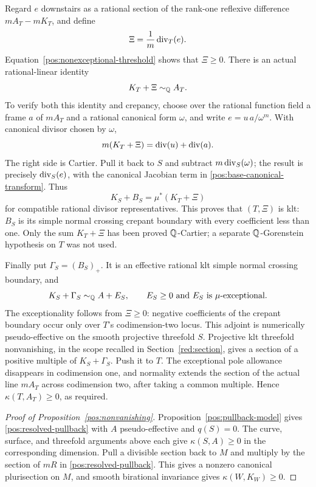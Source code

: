 Regard \(e\) downstairs as a rational section of the rank-one
reflexive difference \(mA_T-mK_T\), and define
\begin{equation}\label{pos:base-boundary}
 \Xi=\frac1m\operatorname{div}_T(e).
\end{equation}
Equation~\eqref{pos:nonexceptional-threshold} shows that
\(\Xi\geq0\). There is an actual rational-linear identity
\begin{equation}\label{pos:base-adjoint}
 K_T+\Xi\sim_{\mathbb{Q}}A_T.
\end{equation}
To verify both this identity and crepancy, choose over the rational
function field a frame \(a\) of \(mA_T\) and a rational canonical
form \(\omega\), and write \(e=u\,a/\omega^m\). With canonical
divisor chosen by \(\omega\),
\[
 m(K_T+\Xi)=\operatorname{div}(u)+\operatorname{div}(a).
\]
The right side is Cartier. Pull it back to \(S\) and subtract
\(m\operatorname{div}_S(\omega)\); the result is precisely
\(\operatorname{div}_S(e)\), with the canonical Jacobian term in
\eqref{pos:base-canonical-transform}. Thus
\begin{equation}\label{pos:actual-crepant-identity}
 K_S+B_S=\mu^*(K_T+\Xi)
\end{equation}
for compatible rational divisor representatives. This proves that
\((T,\Xi)\) is klt: \(B_S\) is its simple normal crossing crepant
boundary with every coefficient less than one. Only the sum
\(K_T+\Xi\) has been proved \(\mathbb{Q}\)-Cartier; a separate
\(\mathbb{Q}\)-Gorenstein hypothesis on \(T\) was not used.

Finally put \(\Gamma_S=(B_S)_+\). It is an effective rational klt
simple normal crossing boundary, and
\[
 K_S+\Gamma_S\sim_{\mathbb{Q}}A+E_S,
 \qquad E_S\geq0\text{ and }E_S\text{ is }\mu\text{-exceptional}.
\]
The exceptionality follows from \(\Xi\geq0\): negative coefficients
of the crepant boundary occur only over \(T\)'s codimension-two
locus. This adjoint is numerically pseudo-effective on the smooth
projective threefold \(S\). Projective klt threefold nonvanishing,
in the scope recalled in Section~\ref{red:section}, gives a section
of a positive multiple of \(K_S+\Gamma_S\). Push it to \(T\).
The exceptional pole allowance disappears in codimension one, and
normality extends the section of the actual line \(mA_T\) across
codimension two, after taking a common multiple. Hence
\(\kappa(T,A_T)\geq0\), as required.

\begin{proof}[Proof of Proposition~\ref{pos:nonvanishing}]
Proposition~\ref{pos:pullback-model} gives
\eqref{pos:resolved-pullback} with \(A\) pseudo-effective and
\(q(S)=0\). The curve, surface, and threefold arguments above each
give \(\kappa(S,A)\geq0\) in the corresponding dimension. Pull a
divisible section back to \(M\) and multiply by the section of
\(mR\) in \eqref{pos:resolved-pullback}. This gives a nonzero
canonical plurisection on \(M\), and smooth birational invariance
gives \(\kappa(W,K_W)\geq0\).
\end{proof}
